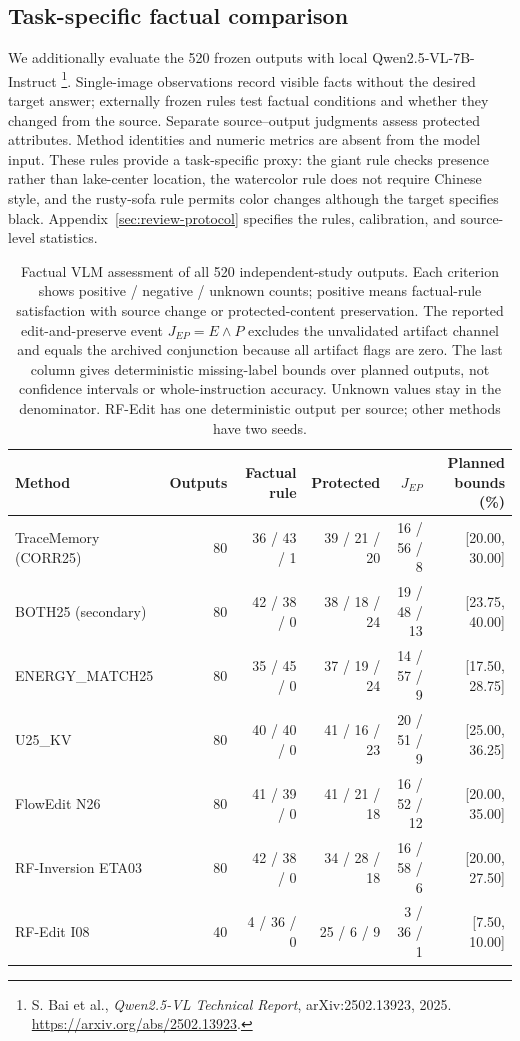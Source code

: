 \subsection{Task-specific factual comparison}
\label{sec:factual-comparison}
We additionally evaluate the 520 frozen outputs with local Qwen2.5-VL-7B-Instruct \footnote{S. Bai et al., \textit{Qwen2.5-VL Technical Report}, arXiv:2502.13923, 2025. \url{https://arxiv.org/abs/2502.13923}.}. Single-image observations record visible facts without the desired target answer; externally frozen rules test factual conditions and whether they changed from the source. Separate source--output judgments assess protected attributes. Method identities and numeric metrics are absent from the model input. These rules provide a task-specific proxy: the giant rule checks presence rather than lake-center location, the watercolor rule does not require Chinese style, and the rusty-sofa rule permits color changes although the target specifies black. Appendix~\ref{sec:review-protocol} specifies the rules, calibration, and source-level statistics.

\begin{table}[t]
\centering\small
\caption{Factual VLM assessment of all 520 independent-study outputs. Each criterion shows positive / negative / unknown counts; positive means factual-rule satisfaction with source change or protected-content preservation. The reported edit-and-preserve event $J_{EP}=E\wedge P$ excludes the unvalidated artifact channel and equals the archived conjunction because all artifact flags are zero. The last column gives deterministic missing-label bounds over planned outputs, not confidence intervals or whole-instruction accuracy. Unknown values stay in the denominator. RF-Edit has one deterministic output per source; other methods have two seeds.}
\label{tab:factual-counts}
\setlength{\tabcolsep}{8pt}
\begin{tabular}{lrrrrr}
\toprule
Method & Outputs & Factual rule & Protected & $J_{EP}$ & Planned bounds (\%)\\
\midrule
TraceMemory (CORR25) & 80 & 36 / 43 / 1 & 39 / 21 / 20 & 16 / 56 / 8 & [20.00, 30.00]\\
BOTH25 (secondary) & 80 & 42 / 38 / 0 & 38 / 18 / 24 & 19 / 48 / 13 & [23.75, 40.00]\\
ENERGY\_MATCH25 & 80 & 35 / 45 / 0 & 37 / 19 / 24 & 14 / 57 / 9 & [17.50, 28.75]\\
U25\_KV & 80 & 40 / 40 / 0 & 41 / 16 / 23 & 20 / 51 / 9 & [25.00, 36.25]\\
FlowEdit N26 & 80 & 41 / 39 / 0 & 41 / 21 / 18 & 16 / 52 / 12 & [20.00, 35.00]\\
RF-Inversion ETA03 & 80 & 42 / 38 / 0 & 34 / 28 / 18 & 16 / 58 / 6 & [20.00, 27.50]\\
RF-Edit I08 & 40 & 4 / 36 / 0 & 25 / 6 / 9 & 3 / 36 / 1 & [7.50, 10.00]\\
\bottomrule
\end{tabular}
\end{table}


